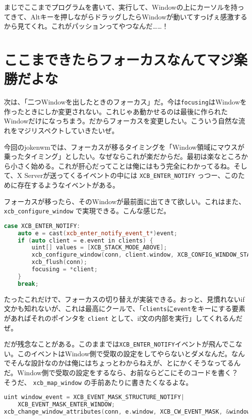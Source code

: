 \documentclass[12pt,a4paper]{jsarticle}
\begin{document}
まじでここまでプログラムを書いて、実行して、Windowの上にカーソルを持ってきて、Altキーを押しながらドラッグしたらWindowが動いてすっげぇ感激するから見てくれ。これがパッションってやつなんだ……！

\section{ここまできたらフォーカスなんてマジ楽勝だよな}

次は、「二つWindowを出したときのフォーカス」だ。今は\lstinline{focusing}はWindowを作ったときにしか変更されない。これじゃあ動かせるのは最後に作られたWindowだけになっちまう。だからフォーカスを変更したい。こういう自然な流れをマジリスペクトしていきたいぜ。

今回のjokenwmでは、フォーカスが移るタイミングを「Window領域にマウスが乗ったタイミング」としたい。なぜならこれが楽だからだ。最初は楽なところから小さく始める。これが肝心だってことは俺にはもう完全にわかってるね。そして、X Serverが送ってくるイベントの中には \lstinline{XCB_ENTER_NOTIFY} っつー、このために存在するようなイベントがある。

フォーカスが移ったら、そのWindowが最前面に出てきて欲しい。これはまた、 \lstinline{xcb_configure_window} で実現できる。こんな感じだ。

\begin{lstlisting}[language=C++]
case XCB_ENTER_NOTIFY:
	auto e = cast(xcb_enter_notify_event_t*)event;
	if (auto client = e.event in clients) {
		uint[] values = [XCB_STACK_MODE_ABOVE];
		xcb_configure_window(conn, client.window, XCB_CONFIG_WINDOW_STACK_MODE, values.ptr);
		xcb_flush(conn);
		focusing = *client;
	}
	break;
\end{lstlisting}

たったこれだけで、フォーカスの切り替えが実装できる。おっと、見慣れないif文かも知れないが、これは最高にクールで、「\lstinline{clients}に\lstinline{event}をキーにする要素があればそれのポインタを \lstinline{client} として、if文の内部を実行」してくれるんだぜ。

だが残念なことがある。このままでは\lstinline{XCB_ENTER_NOTIFY}イベントが飛んでこない。このイベントはWindow側で受取の設定をしてやらないとダメなんだ。なんでそんな設計なのかは俺にはちょっとわからねえが、とにかくそうなってるんだ。Window側で受取の設定をするなら、お前ならどこにそのコードを書く？　そうだ、 \lstinline{xcb_map_window} の手前あたりに書きたくなるよな。

\begin{lstlisting}[language=C++]
uint window_event = XCB_EVENT_MASK_STRUCTURE_NOTIFY|
	XCB_EVENT_MASK_ENTER_WINDOW;
xcb_change_window_attributes(conn, e.window, XCB_CW_EVENT_MASK, &window_event);
\end{lstlisting}
\end{document}
